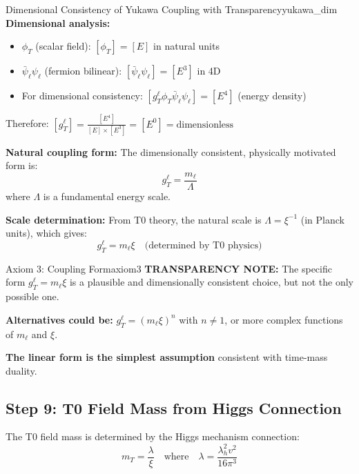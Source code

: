 \documentclass[12pt,a4paper]{article}
\begin{document}
	\begin{important}{Dimensional Consistency of Yukawa Coupling with Transparency}{yukawa_dim}
		\textbf{Dimensional analysis:}
		\begin{itemize}
			\item $\phi_T$ (scalar field): $[\phi_T] = [E]$ in natural units
			\item $\bar{\psi}_\ell \psi_\ell$ (fermion bilinear): $[\bar{\psi}_\ell \psi_\ell] = [E^3]$ in 4D
			\item For dimensional consistency: $[g_T^\ell \phi_T \bar{\psi}_\ell \psi_\ell] = [E^4]$ (energy density)
		\end{itemize}
		
		Therefore: $[g_T^\ell] = \frac{[E^4]}{[E] \times [E^3]} = [E^0] = \text{dimensionless}$
		
		\textbf{Natural coupling form:}
		The dimensionally consistent, physically motivated form is:
		\begin{equation}
			g_T^\ell = \frac{m_\ell}{\Lambda}
		\end{equation}
		where $\Lambda$ is a fundamental energy scale.
		
		\textbf{Scale determination:} From T0 theory, the natural scale is $\Lambda = \xi^{-1}$ (in Planck units), which gives:
		\begin{equation}
			\boxed{g_T^\ell = m_\ell \xi} \quad \text{(determined by T0 physics)}
		\end{equation}
		
		\begin{warning}{Axiom 3: Coupling Form}{axiom3}
			\textbf{TRANSPARENCY NOTE:} The specific form $g_T^\ell = m_\ell \xi$ is a plausible and dimensionally consistent choice, but not the only possible one.
			
			\textbf{Alternatives could be:} $g_T^\ell = (m_\ell \xi)^n$ with $n \neq 1$, or more complex functions of $m_\ell$ and $\xi$.
			
			\textbf{The linear form is the simplest assumption} consistent with time-mass duality.
		\end{warning}
	\end{important}
	
	\subsection{Step 9: T0 Field Mass from Higgs Connection}
	
	The T0 field mass is determined by the Higgs mechanism connection:
	\begin{equation}
		m_T = \frac{\lambda}{\xi} \quad \text{where} \quad \lambda = \frac{\lambda_h^2 v^2}{16\pi^3}
		\label{eq:mT_definition}
	\end{equation}
	
\end{document}
